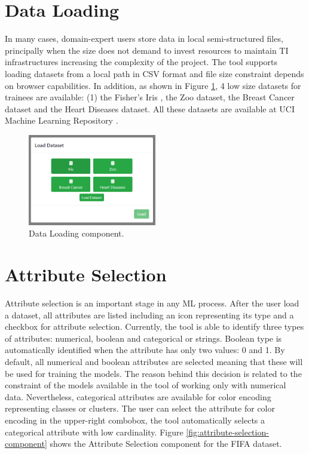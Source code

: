 \section{Data Loading}
\label{section4.1}

In many cases, domain-expert users store data in local semi-structured files, principally when the size does not demand to invest resources to maintain TI infrastructures increasing the complexity of the project.
The tool supports loading datasets from a local path in CSV format and file size constraint depends on browser capabilities. In addition, as shown in Figure \ref{fig:load-dataset-component}, 4 low size datasets for trainees are available: (1) the Fisher's Iris \cite{FisherIris}, the Zoo dataset, the Breast Cancer dataset and the Heart Diseases dataset. All these datasets are available at UCI Machine Learning Repository \cite{Dua2017UCIRepository}.

\begin{figure}[ht]
 \centering
 \includegraphics[width=0.5\textwidth]{load_dataset.png}
 \caption{Data Loading component.}
 \label{fig:load-dataset-component}
\end{figure}

\section{Attribute Selection}
\label{section4.2}

Attribute selection is an important stage in any ML process. After the user load a dataset, all attributes are listed including an icon representing its type and a checkbox for attribute selection. Currently, the tool is able to identify three types of attributes: numerical, boolean and categorical or strings. Boolean type is automatically identified when the attribute has only two values: 0 and 1. By default, all numerical and boolean attributes are selected meaning that these will be used for training the models. The reason behind this decision is related to the constraint of the models available in the tool of working only with numerical data. Nevertheless, categorical attributes are available for color encoding representing classes or clusters. The user can select the attribute for color encoding in the upper-right combobox, the tool automatically selects a categorical attribute with low cardinality. Figure \ref{fig:attribute-selection-component} shows the Attribute Selection component for the FIFA dataset.

